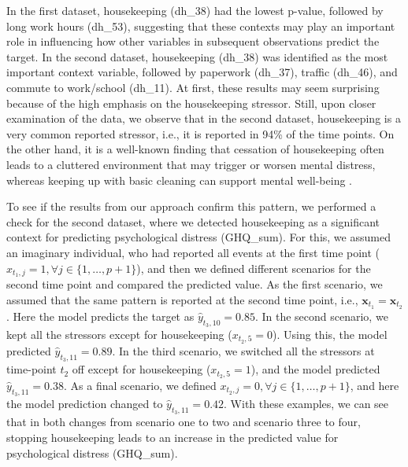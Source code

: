 \documentclass[AMA,Times1COL]{WileyNJDv5} %
\begin{document}
In the first dataset, housekeeping (dh\_38) had the lowest p-value, followed by long work hours (dh\_53), suggesting that these contexts may play an important role in influencing how other variables in subsequent observations predict the target. In the second dataset, housekeeping (dh\_38) was identified as the most important context variable, followed by paperwork (dh\_37), traffic (dh\_46), and commute to work/school (dh\_11). At first, these results may seem surprising because of the high emphasis on the housekeeping stressor. Still, upon closer examination of the data, we observe that in the second dataset, housekeeping is a very common reported stressor, i.e., it is reported in 94\% of the time points. On the other hand, it is a well-known finding that cessation of housekeeping often leads to a cluttered environment that may trigger or worsen mental distress, whereas keeping up with basic cleaning can support mental well-being \citep{roster_dark_2016}. 

To see if the results from our approach confirm this pattern, we performed a check for the second dataset, where we detected housekeeping as a significant context for predicting psychological distress (GHQ\_sum). For this, we assumed an imaginary individual, who had reported all events at the first time point (\(x_{t_1, j} = 1, \forall j \in \{1,\ldots, p+1\}\)), and then we defined different scenarios for the second time point and compared the predicted value. As the first scenario, we assumed that the same pattern is reported at the second time point, i.e., \(\mathbf{x}_{t_1} = \mathbf{x}_{t_2}\). Here the model predicts the target as \(\hat{y}_{t_3, 10} = 0.85\). In the second scenario, we kept all the stressors except for housekeeping (\(x_{t_2, 5} = 0\)). Using this, the model predicted \(\hat{y}_{t_3, 11} = 0.89\). In the third scenario, we switched all the stressors at time-point \(t_2\) off except for housekeeping (\(x_{t_2, 5} = 1\)), and the model predicted \(\hat{y}_{t_3, 11} = 0.38\). As a final scenario, we defined \(x_{t_2, j} = 0, \forall j \in \{1, \ldots, p+1\}\), and here the model prediction changed to \(\hat{y}_{t_3, 11} = 0.42\). With these examples, we can see that in both changes from scenario one to two and scenario three to four, stopping housekeeping leads to an increase in the predicted value for psychological distress (GHQ\_sum).
\end{document}
